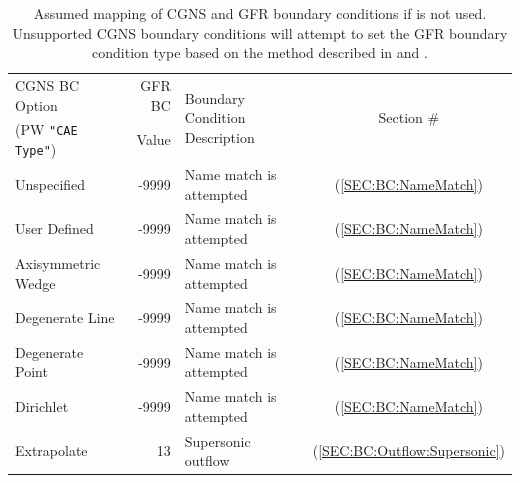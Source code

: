 \begin{table}[tb]
  \centering
  \caption[Assumed mapping between CGNS and GFR boundary conditions.]%
          {Assumed mapping of CGNS and GFR boundary conditions if
            is not used. Unsupported CGNS boundary
           conditions will attempt to set the GFR boundary condition type based
           on the  method described in
            and .}
  \label{TBL:PW_BC_GFR_Match}
  \begin{tabular}{ @{} l r @{\qquad} l @{\qquad} c @{} }
    \toprule
    CGNS BC Option & GFR BC &
         \multirow[b]{2}{*}{Boundary Condition Description} &
         \multirow[b]{2}{*}{Section \#} \\ %
    (PW \texttt{"CAE Type"}) & Value & & \\ %
    \midrule
    Unspecified             & -9999 & Name match is attempted
                                    & (\ref{SEC:BC:NameMatch}) \\
    User Defined            & -9999 & Name match is attempted
                                    & (\ref{SEC:BC:NameMatch}) \\
    Axisymmetric Wedge      & -9999 & Name match is attempted
                                    & (\ref{SEC:BC:NameMatch}) \\
    Degenerate Line         & -9999 & Name match is attempted
                                    & (\ref{SEC:BC:NameMatch}) \\
    Degenerate Point        & -9999 & Name match is attempted
                                    & (\ref{SEC:BC:NameMatch}) \\
    Dirichlet               & -9999 & Name match is attempted
                                    & (\ref{SEC:BC:NameMatch}) \\
    Extrapolate             &    13 & Supersonic outflow
                                    & (\ref{SEC:BC:Outflow:Supersonic}) \\

\end{tabular}
\end{table}
